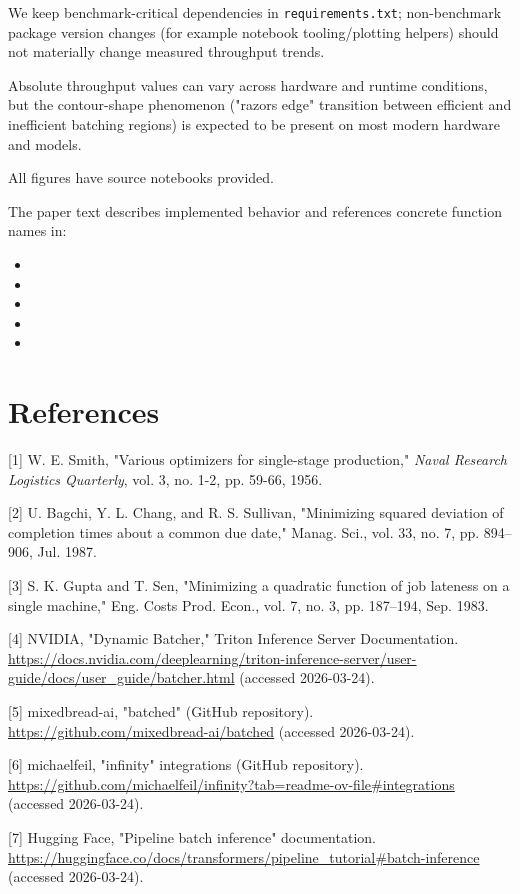 \documentclass{article}
\providecommand{\tightlist}{\setlength{\itemsep}{0pt}\setlength{\parskip}{0pt}}
\begin{document}
We keep benchmark-critical dependencies in \texttt{requirements.txt};
non-benchmark package version changes (for example notebook
tooling/plotting helpers) should not materially change measured
throughput trends.

Absolute throughput values can vary across hardware and runtime
conditions, but the contour-shape phenomenon ("razor\textquotesingle s
edge" transition between efficient and inefficient batching regions) is
expected to be present on most modern hardware and models.

All figures have source notebooks provided.

The paper text describes implemented behavior and references concrete
function names in:

\begin{itemize}
\tightlist
\item
\item
\item
\item
\item
\end{itemize}

\hypertarget{13-references}{%
\section{References}\label{13-references}}

{[}1{]} W. E. Smith, "Various optimizers for single-stage production,"
\emph{Naval Research Logistics Quarterly}, vol. 3, no. 1-2, pp. 59-66,
1956.

{[}2{]} U. Bagchi, Y. L. Chang, and R. S. Sullivan, "Minimizing squared
deviation of completion times about a common due date," Manag. Sci.,
vol. 33, no. 7, pp. 894--906, Jul. 1987.

{[}3{]} S. K. Gupta and T. Sen, "Minimizing a quadratic function of job
lateness on a single machine," Eng. Costs Prod. Econ., vol. 7, no. 3,
pp. 187--194, Sep. 1983.

{[}4{]} NVIDIA, "Dynamic Batcher," Triton Inference Server
Documentation.
\url{https://docs.nvidia.com/deeplearning/triton-inference-server/user-guide/docs/user_guide/batcher.html}
(accessed 2026-03-24).

{[}5{]} mixedbread-ai, "batched" (GitHub repository).
\url{https://github.com/mixedbread-ai/batched} (accessed 2026-03-24).

{[}6{]} michaelfeil, "infinity" integrations (GitHub repository).
\url{https://github.com/michaelfeil/infinity?tab=readme-ov-file\#integrations}
(accessed 2026-03-24).

{[}7{]} Hugging Face, "Pipeline batch inference" documentation.
\url{https://huggingface.co/docs/transformers/pipeline_tutorial\#batch-inference}
(accessed 2026-03-24).
\end{document}
